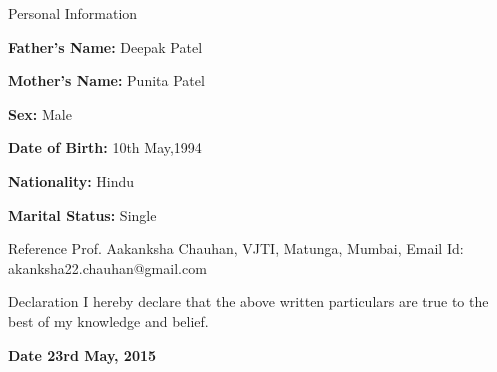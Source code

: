\documentclass{resume} %
\begin{document}
\begin{rSection}{Personal Information}
	\item \textbf{Father’s Name:} Deepak Patel
	\item \textbf{Mother’s Name: } Punita Patel
	\item \textbf{Sex:} Male
	\item \textbf{Date of Birth:} 10th May,1994 
	\item \textbf{Nationality: } Hindu
	\item \textbf{Marital Status:}	Single
\end{rSection}

\newpage
\begin{rSection}{Reference}
	Prof. Aakanksha Chauhan,
	\newline
	VJTI, Matunga, Mumbai,
	\newline
	Email Id: akanksha22.chauhan@gmail.com
	
\end{rSection}
\begin{rSection}{Declaration}
	I hereby declare that the above written particulars are true to the best of my knowledge and belief.
\end{rSection}

\begin{rSection}
	\bf Date 23rd May, 2015
\end{rSection}
\end{document}
